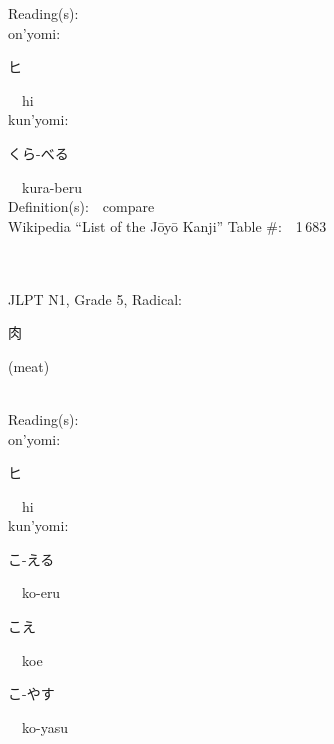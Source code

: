\begin{multicols}{2}
Reading(s):\ \ \\
{\hspace*{1em}}on'yomi:\ \ \\
{\hspace*{2em}}{\begin{CJK}{UTF8}{min} ヒ \end{CJK}}\ \ hi\ \ \\
{\hspace*{1em}}kun'yomi:\ \ \\
{\hspace*{2em}}{\begin{CJK}{UTF8}{min} くら-べる \end{CJK}}\ \ kura-beru\ \ \\
Definition(s):\ \ compare \\
Wikipedia ``List of the J\=oy\=o Kanji'' Table \#:\ \ 1\,683 \\
\ \ \\
{\fontsize{34pt}{40pt}  }\ \ \\  %
{JLPT N1, Grade 5, Radical:\ \ {\begin{CJK}{UTF8}{min} 肉 \end{CJK}} (meat) } \\
Reading(s):\ \ \\
{\hspace*{1em}}on'yomi:\ \ \\
{\hspace*{2em}}{\begin{CJK}{UTF8}{min} ヒ \end{CJK}}\ \ hi\ \ \\
{\hspace*{1em}}kun'yomi:\ \ \\
{\hspace*{2em}}{\begin{CJK}{UTF8}{min} こ-える \end{CJK}}\ \ ko-eru\ \ \\
{\hspace*{2em}}{\begin{CJK}{UTF8}{min} こえ \end{CJK}}\ \ koe\ \ \\
{\hspace*{2em}}{\begin{CJK}{UTF8}{min} こ-やす \end{CJK}}\ \ ko-yasu\ \ \\

\end{multicols}
